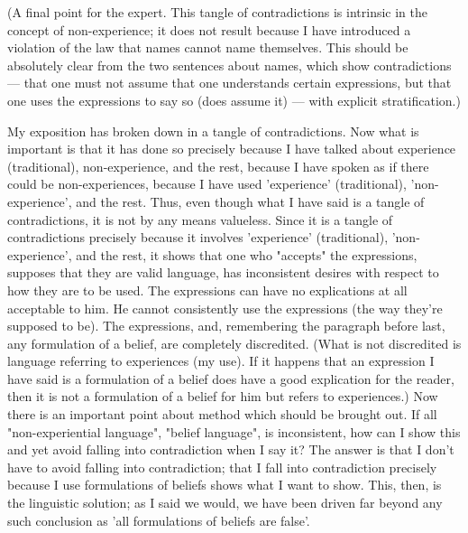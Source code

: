 \documentclass[10pt,twoside]{memoir}
\begin{document}
\begin{enumerate}
{(A final point for the expert. This 
tangle of contradictions is intrinsic in the concept of non-experience; it does 
not result because I have introduced a violation of the law that names cannot 
name themselves. This should be absolutely clear from the two sentences 
about names, which show contradictions --- that one must not assume that 
one understands certain expressions, but that one uses the expressions to say 
so (does assume it) --- with explicit stratification.) 

My exposition has broken down in a tangle of contradictions. Now 
what is important is that it has done so precisely because I have talked about 
experience (traditional), non-experience, and the rest, because I have spoken 
as if there could be non-experiences, because I have used 'experience' 
(traditional), 'non-experience', and the rest. Thus, even though what I have 
said is a tangle of contradictions, it is not by any means valueless. Since it is 
a tangle of contradictions precisely because it involves 'experience' 
(traditional), 'non-experience', and the rest, it shows that one who "accepts" 
the expressions, supposes that they are valid language, has inconsistent 
desires with respect to how they are to be used. The expressions can have no 
explications at all acceptable to him. He cannot consistently use the 
expressions (the way they're supposed to be). The expressions, and, 
remembering the paragraph before last, any formulation of a belief, are 
completely discredited. (What is not discredited is language referring to 
experiences (my use). If it happens that an expression I have said is a 
formulation of a belief does have a good explication for the reader, then it is 
not a formulation of a belief for him but refers to experiences.) Now there is 
an important point about method which should be brought out. If all 
"non-experiential language", "belief language", is inconsistent, how can I 
show this and yet avoid falling into contradiction when I say it? The answer 
is that I don't have to avoid falling into contradiction; that I fall into 
contradiction precisely because I use formulations of beliefs shows what I 
want to show. This, then, is the linguistic solution; as I said we would, we 
have been driven far beyond any such conclusion as 'all formulations of 
beliefs are false'. 

}
\end{enumerate}
\end{document}
